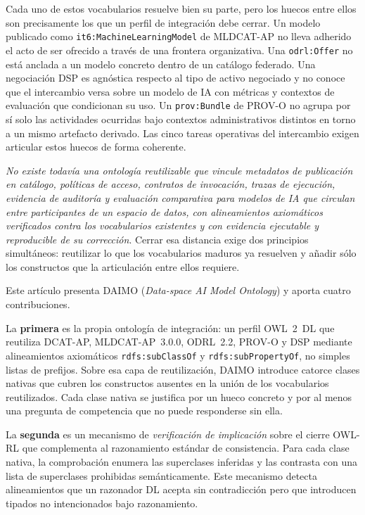 \documentclass[Afour,sagev,times]{sagej}
\newcommand{\code}[1]{\texttt{#1}}
\begin{document}
Cada uno de estos vocabularios resuelve bien su parte, pero los huecos entre ellos son precisamente los que un perfil de integración debe cerrar. Un modelo publicado como \code{it6:MachineLearningModel} de MLDCAT-AP no lleva adherido el acto de ser ofrecido a través de una frontera organizativa. Una \code{odrl:Offer} no está anclada a un modelo concreto dentro de un catálogo federado. Una negociación DSP es agnóstica respecto al tipo de activo negociado y no conoce que el intercambio versa sobre un modelo de IA con métricas y contextos de evaluación que condicionan su uso. Un \code{prov:Bundle} de PROV-O no agrupa por sí solo las actividades ocurridas bajo contextos administrativos distintos en torno a un mismo artefacto derivado. Las cinco tareas operativas del intercambio exigen articular estos huecos de forma coherente.

\emph{No existe todavía una ontología reutilizable que vincule metadatos de publicación en catálogo, políticas de acceso, contratos de invocación, trazas de ejecución, evidencia de auditoría y evaluación comparativa para modelos de IA que circulan entre participantes de un espacio de datos, con alineamientos axiomáticos verificados contra los vocabularios existentes y con evidencia ejecutable y reproducible de su corrección}. Cerrar esa distancia exige dos principios simultáneos: reutilizar lo que los vocabularios maduros ya resuelven y añadir sólo los constructos que la articulación entre ellos requiere.

Este artículo presenta DAIMO (\emph{Data-space AI Model Ontology}) y aporta cuatro contribuciones.

La \textbf{primera} es la propia ontología de integración: un perfil OWL~2~DL que reutiliza DCAT-AP, MLDCAT-AP~3.0.0, ODRL~2.2, PROV-O y DSP mediante alineamientos axiomáticos \code{rdfs:subClassOf} y \code{rdfs:subPropertyOf}, no simples listas de prefijos. Sobre esa capa de reutilización, DAIMO introduce catorce clases nativas que cubren los constructos ausentes en la unión de los vocabularios reutilizados. Cada clase nativa se justifica por un hueco concreto y por al menos una pregunta de competencia que no puede responderse sin ella.

La \textbf{segunda} es un mecanismo de \emph{verificación de implicación} sobre el cierre OWL-RL que complementa al razonamiento estándar de consistencia. Para cada clase nativa, la comprobación enumera las superclases inferidas y las contrasta con una lista de superclases prohibidas semánticamente. Este mecanismo detecta alineamientos que un razonador DL acepta sin contradicción pero que introducen tipados no intencionados bajo razonamiento.
\end{document}
